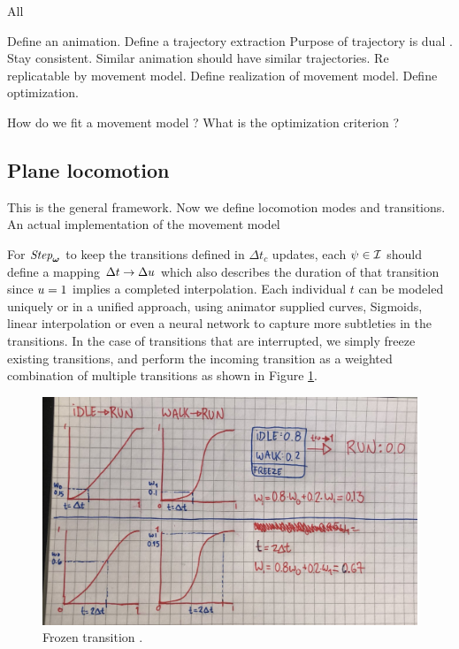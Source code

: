 
All 

Define an animation.
Define a trajectory extraction
Purpose of trajectory is dual . Stay consistent. Similar animation should have similar trajectories. Re replicatable by movement model. 
Define realization of movement model. 
Define optimization.


How do we fit a movement model ? What is the optimization criterion ?

\subsection{Plane locomotion}

This is the general framework. Now we define locomotion modes and transitions. An actual implementation of the movement model

For $\textit{Step}_{\boldsymbol{\omega }}$ to keep the transitions defined in $\Delta{t}_c$ updates, each $\psi\in\mathcal{I}$ should define a mapping $\Delta{t} \rightarrow \Delta u$ which also describes the duration of that transition since $u=1$ implies a completed interpolation. Each individual $t$ can be modeled uniquely or in a unified approach, using animator supplied curves, Sigmoids, linear interpolation or even a neural network to capture more subtleties in the transitions. In the case of transitions that are interrupted, we simply freeze existing transitions, and perform the incoming transition as a weighted combination of multiple transitions as shown in Figure \ref{fig:frozen-transition}. 
\begin{figure}
    \centering
    \includegraphics[width=0.75\columnwidth]{img/frozen-transitions}
    \caption{Frozen transition .}
  \label{fig:frozen-transition}
\end{figure}

